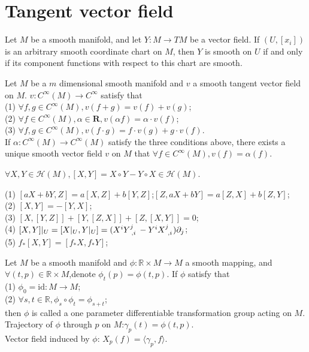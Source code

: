 \section{Tangent vector field}
\begin{newthem}
Let $M$ be a smooth manifold, and let $Y:M \to TM$ be a vector field. If $(U, [x_i])$ is an arbitrary smooth coordinate chart on $M$, then $Y$ is smooth on $U$ if and only if its component functions with respect to this chart are smooth.
\end{newthem}

\begin{newthem}
Let $M$ be a $m$ dimensional smooth manifold and $v$ a smooth tangent vector field on $M$. $v:C^{\infty}(M) \to C^{\infty}$ satisfy that\\
(1) $\forall f,g \in C^{\infty}(M),v(f+g)=v(f)+v(g)$;\\
(2) $\forall f \in C^{\infty}(M),\alpha \in \bm{R},v(\alpha f)=\alpha \cdot v(f)$;\\
(3) $\forall f,g \in C^{\infty}(M),v(f\cdot g) = f \cdot v(g) + g \cdot v(f)$.\\
If $\alpha:C^{\infty}(M) \to C^{\infty}(M)$ satisfy the three conditions above, there exists a unique smooth vector field $v$ on $M$ that $\forall f \in C^{\infty}(M),v(f)=\alpha(f)$.
\end{newthem}

\begin{newthem}
$\forall X,Y \in \mathcal{H}(M),[X,Y]=X \circ Y -Y \circ X \in \mathcal{H}(M)$.
\end{newthem}

\begin{newprop}
(1) $[aX+bY,Z]=a[X,Z]+b[Y,Z]$;$[Z,aX+bY]=a[Z,X]+b[Z,Y]$;\\
(2) $[X,Y]=-[Y,X]$;\\
(3) $[X,[Y,Z]] + [Y,[Z,X]] +[Z,[X,Y]]=0$;\\
(4) $[X,Y]|_{U} = [X|_{U},Y|_{U}] = (X^i \tensor{Y}{^j_{,i}} - Y^i \tensor{X}{^j_{,i}}) \partial_{j}$;\\
(5) $f_{*}[X,Y] = [f_{*}X,f_{*}Y]$;
\end{newprop}

\begin{newdef}
Let $M$ be a smooth manifold and $\phi:\mathbb{R} \times M \to M$ a smooth mapping, and $\forall (t,p) \in \mathbb{R} \times M$,denote $\phi_{t}(p) = \phi(t,p)$. If $\phi$ satisfy that\\
(1) $\phi_0 = \mathrm{id}:M \to M$;\\
(2) $\forall s,t \in \mathbb{R}, \phi_s \circ \phi_t = \phi_{s+t}$;\\
then $\phi$ is called a one parameter differentiable transformation group acting on $M$.\\
Trajectory of $\phi$ through $p$ on $M$:$\gamma_p(t) = \phi(t,p)$.\\
Vector field induced by $\phi$: $X_p(f) = \langle \gamma_p , f \rangle$.
\end{newdef}

